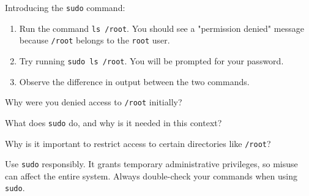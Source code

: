 \begin{challenge}
    \begin{task}
    Introducing the \texttt{sudo} command:
    \begin{enumerate}
        \item Run the command \texttt{ls /root}. You should see a "permission denied" message because \texttt{/root} belongs to the \texttt{root} user.
        \item Try running \texttt{sudo ls /root}. You will be prompted for your password.
        \item Observe the difference in output between the two commands.
    \end{enumerate}
    \begin{questions}
        \item Why were you denied access to \texttt{/root} initially?
        \item What does \texttt{sudo} do, and why is it needed in this context?
        \item Why is it important to restrict access to certain directories like \texttt{/root}?
    \end{questions}
    \end{task}

    \begin{advice}
        Use \texttt{sudo} responsibly. It grants temporary administrative privileges, so misuse can affect the entire system. Always double-check your commands when using \texttt{sudo}.
    \end{advice}
\end{challenge}
